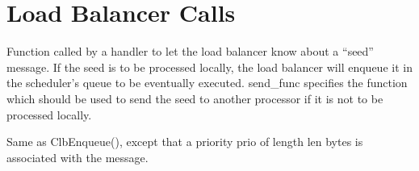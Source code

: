 \chapter{Load Balancer Calls}


Function called by a handler to let the load balancer know about a
``seed'' message. If the seed is to be processed locally, the
load balancer will
enqueue it in the scheduler's queue to be eventually executed.
{\sf send\_func} specifies the function
which should be used to send the seed to another processor
if it is not to be processed locally.

Same as {\sf ClbEnqueue()}, except that a priority {\sf prio} of length
{\sf len} bytes is associated with the message.



